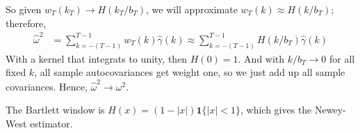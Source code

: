 \documentclass[12pt]{article}
\theoremstyle{plain}
\theoremstyle{definition}
\theoremstyle{remark}
\newcommand{\ra}{\rightarrow}
\begin{document}
So given $w_T(k_T)\ra H(k_T/b_T)$, we will approximate
$w_T(k)\approx H(k/b_T)$; therefore,
\begin{align*}
  \hat{\omega}^2
  &=
  \sum_{k=-(T-1)}^{T-1}
  w_T(k)
  \hat{\gamma}(k)
  \approx
  \sum_{k=-(T-1)}^{T-1}
  H(k/b_T)
  \hat{\gamma}(k)
\end{align*}
With a kernel that integrats to unity, then $H(0)=1$.
And with $k/b_T\ra 0$ for all fixed $k$, all sample autocovariances get
weight one, so we just add up all sample covariances. Hence,
$\hat{\omega}^2\ra\omega^2$.

The Bartlett window is $H(x)=(1-|x|)\mathbf{1}\{|x|<1\}$, which gives
the Newey-West estimator.













\end{document}
